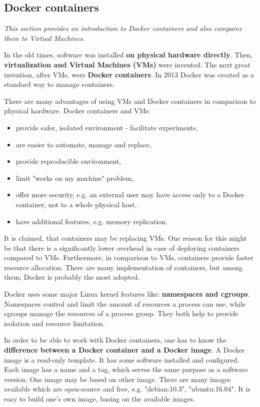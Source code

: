 \subsection{Docker containers}
\textit{This section provides an introduction to Docker containers and also compares them to Virtual Machines.}

In the old times, software was installed \textbf{on physical hardware directly}. Then, \textbf{virtualization and Virtual Machines (VMs)} were invented. The next great invention, after VMs, were \textbf{Docker containers}. In 2013 Docker was created as a standard way to manage containers\cite{book-devops-k8s}.

There are many advantages of using VMs and Docker containers in comparison to physical hardware. Docker containers and VMs:
\begin{itemize}
\item provide safer, isolated environment - facilitate experiments,
\item are easier to automate, manage and replace,
\item provide reproducible environment,
\item limit "works on my machine" problem,
\item offer more security, e.g. an external user may have access only to a Docker container, not to a whole physical host,
\item have additional features, e.g. memory replication.
\end{itemize}

It is claimed, that containers may be replacing VMs. One reason for this might be that there is a significantly lower overhead in case of deploying containers compared to VMs\cite{article-modelling-performance-k8s}. Furthermore, in comparison to VMs, containers provide faster resource allocation. There are many implementation of containers, but among them, Docker is probably the most adopted\cite{article-state-machine}.

Docker uses some major Linux kernel features like: \textbf{namespaces and cgroups}. Namespaces control and limit the amount of resources a process can use, while cgroups manage the resources of a process group. They both help to provide isolation and resource limitation\cite{book-devops-k8s}\cite{art-byza}.

In order to be able to work with Docker containers, one has to know the \textbf{difference between a Docker container and a Docker image}. A Docker image is a read-only template. It has some software installed and configured. Each image has a name and a tag, which serves the same purpose as a software version. One image may be based on other image. There are many images available which are open-source and free, e.g. "debian:10.3"\cite{online-dh-debian}, "ubuntu:16.04"\cite{online-dh-ubuntu}. It is easy to build one’s own image, basing on the available images\cite{online-docker-doc}.

